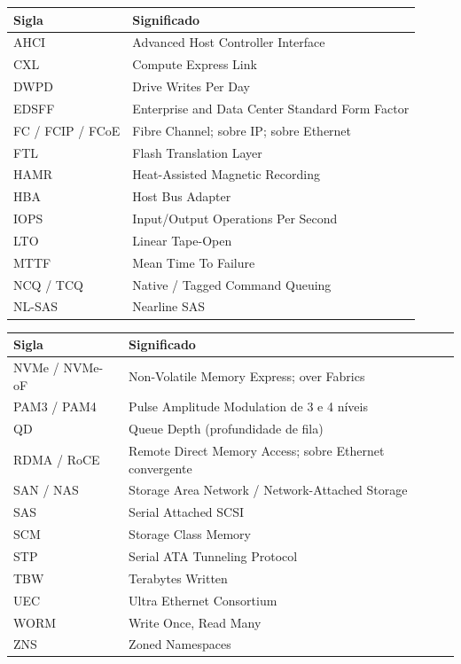 \documentclass[11pt,a4paper]{article}
\begin{document}
{\small
\noindent
\begin{minipage}[t]{0.49\textwidth}
\begin{tabular}[t]{@{}l>{\RaggedRight\arraybackslash}p{4.4cm}@{}}
\toprule
\textbf{Sigla} & \textbf{Significado} \\
\midrule
AHCI & Advanced Host Controller Interface \\
CXL & Compute Express Link \\
DWPD & Drive Writes Per Day \\
EDSFF & Enterprise and Data Center Standard Form Factor \\
FC / FCIP / FCoE & Fibre Channel; sobre IP; sobre Ethernet \\
FTL & Flash Translation Layer \\
HAMR & Heat-Assisted Magnetic Recording \\
HBA & Host Bus Adapter \\
IOPS & Input/Output Operations Per Second \\
LTO & Linear Tape-Open \\
MTTF & Mean Time To Failure \\
NCQ / TCQ & Native / Tagged Command Queuing \\
NL-SAS & Nearline SAS \\
\bottomrule
\end{tabular}
\end{minipage}\hfill
\begin{minipage}[t]{0.49\textwidth}
\begin{tabular}[t]{@{}l>{\RaggedRight\arraybackslash}p{4.4cm}@{}}
\toprule
\textbf{Sigla} & \textbf{Significado} \\
\midrule
NVMe / NVMe-oF & Non-Volatile Memory Express; over Fabrics \\
PAM3 / PAM4 & Pulse Amplitude Modulation de 3 e 4 níveis \\
QD & Queue Depth (profundidade de fila) \\
RDMA / RoCE & Remote Direct Memory Access; sobre Ethernet convergente \\
SAN / NAS & Storage Area Network / Network-Attached Storage \\
SAS & Serial Attached SCSI \\
SCM & Storage Class Memory \\
STP & Serial ATA Tunneling Protocol \\
TBW & Terabytes Written \\
UEC & Ultra Ethernet Consortium \\
WORM & Write Once, Read Many \\
ZNS & Zoned Namespaces \\
\bottomrule
\end{tabular}
\end{minipage}
}
\end{document}
